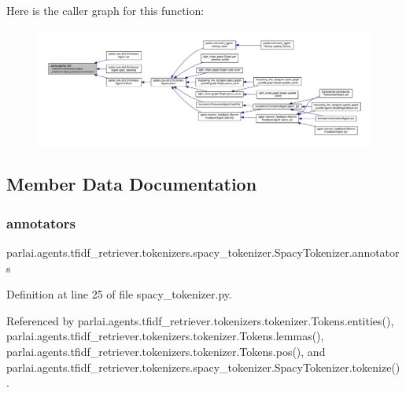 Here is the caller graph for this function\+:
\nopagebreak
\begin{figure}[H]
\begin{center}
\leavevmode
\includegraphics[width=350pt]{classparlai_1_1agents_1_1tfidf__retriever_1_1tokenizers_1_1spacy__tokenizer_1_1SpacyTokenizer_a479b83909bafee8db3f60c9d8fe69635_icgraph}
\end{center}
\end{figure}


\subsection{Member Data Documentation}
\mbox{\label{classparlai_1_1agents_1_1tfidf__retriever_1_1tokenizers_1_1spacy__tokenizer_1_1SpacyTokenizer_a6d3d9c1c8632f0b1ec559b3bbef9fe60}} 
\subsubsection{\texorpdfstring{annotators}{annotators}}
{\footnotesize\ttfamily parlai.\+agents.\+tfidf\+\_\+retriever.\+tokenizers.\+spacy\+\_\+tokenizer.\+Spacy\+Tokenizer.\+annotators}



Definition at line 25 of file spacy\+\_\+tokenizer.\+py.



Referenced by parlai.\+agents.\+tfidf\+\_\+retriever.\+tokenizers.\+tokenizer.\+Tokens.\+entities(), parlai.\+agents.\+tfidf\+\_\+retriever.\+tokenizers.\+tokenizer.\+Tokens.\+lemmas(), parlai.\+agents.\+tfidf\+\_\+retriever.\+tokenizers.\+tokenizer.\+Tokens.\+pos(), and parlai.\+agents.\+tfidf\+\_\+retriever.\+tokenizers.\+spacy\+\_\+tokenizer.\+Spacy\+Tokenizer.\+tokenize().

